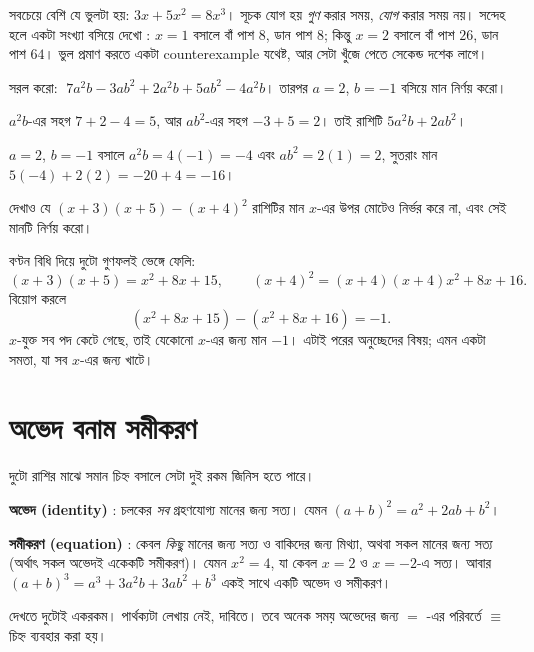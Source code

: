 \documentclass[11pt]{article}
\begin{document}
\begin{remark}
সবচেয়ে বেশি যে ভুলটা হয়: $3x + 5x^2 = 8x^3$। সূচক যোগ হয় \emph{গুণ} করার সময়,
\emph{যোগ} করার সময় নয়। সন্দেহ হলে একটা সংখ্যা বসিয়ে দেখো : $x = 1$ বসালে
বাঁ পাশ $8$, ডান পাশ $8$; কিন্তু $x = 2$ বসালে বাঁ পাশ $26$, ডান পাশ $64$। ভুল প্রমাণ করতে
একটা counterexample যথেষ্ট, আর সেটা খুঁজে পেতে সেকেন্ড দশেক লাগে।
\end{remark}

 সরল করো: $\;7a^2b - 3ab^2 + 2a^2b + 5ab^2 - 4a^2b$। তারপর $a = 2$,
$b = -1$ বসিয়ে মান নির্ণয় করো।

\begin{sol}
$a^2b$-এর সহগ $7 + 2 - 4 = 5$, আর $ab^2$-এর সহগ $-3 + 5 = 2$। তাই রাশিটি
$5a^2b + 2ab^2$।

$a = 2$, $b = -1$ বসালে $a^2b = 4(-1) = -4$ এবং $ab^2 = 2(1) = 2$, সুতরাং মান
$5(-4) + 2(2) = -20 + 4 = -16$।
\end{sol}

 দেখাও যে $(x+3)(x+5) - (x+4)^2$ রাশিটির মান $x$-এর উপর মোটেও নির্ভর
করে না, এবং সেই মানটি নির্ণয় করো।

\begin{sol}
বণ্টন বিধি দিয়ে দুটো গুণফলই ভেঙ্গে ফেলি:
\[
  (x+3)(x+5) = x^2 + 8x + 15, \qquad (x+4)^2 =(x+4)(x+4) x^2 + 8x + 16 .
\]
বিয়োগ করলে
\[
  (x^2 + 8x + 15) - (x^2 + 8x + 16) = -1 .
\]
$x$-যুক্ত সব পদ কেটে গেছে, তাই যেকোনো $x$-এর জন্য মান $-1$। এটাই পরের অনুচ্ছেদের
বিষয়; এমন একটা সমতা, যা সব $x$-এর জন্য খাটে।
\end{sol}

\section{অভেদ বনাম সমীকরণ}

\begin{idea}[অভেদ সব মানের জন্য, সমীকরণ কেবল কিছু মানের জন্য]
দুটো রাশির মাঝে সমান চিহ্ন বসালে সেটা দুই রকম জিনিস হতে পারে।

\textbf{অভেদ (identity)} : চলকের \emph{সব} গ্রহণযোগ্য মানের জন্য সত্য।
যেমন $(a+b)^2 = a^2 + 2ab + b^2$।

\textbf{সমীকরণ (equation)} : কেবল \emph{কিছু} মানের জন্য সত্য ও বাকিদের জন্য
মিথ্যা, অথবা সকল মানের জন্য সত্য (অর্থাৎ সকল অভেদই একেকটি সমীকরণ)। যেমন $x^2 = 4$, যা কেবল $x = 2$ ও $x = -2$-এ সত্য। আবার $(a+b)^3=a^3+3a^2b+3ab^2+b^3$ একই সাথে একটি অভেদ ও সমীকরণ।

দেখতে দুটোই একরকম। পার্থক্যটা লেখায় নেই, দাবিতে। তবে অনেক সময় অভেদের জন্য $=$ -এর পরিবর্তে $\equiv$ চিহ্ন ব্যবহার করা হয়। 
\end{idea}
\end{document}
